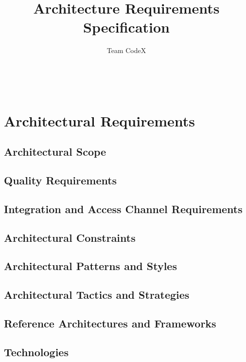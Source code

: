 \documentclass[11pt]{article}
\author{Team CodeX}
\title{Architecture Requirements Specification}
\begin{document}
	\setlength{\parskip}{6pt}
	
	
	
	\renewcommand{\thesection}{\arabic{section}}
	\newpage
	
	\tableofcontents
	
	\textsc{}\\[1cm]
	
	\newpage

	\section{Architectural Requirements}
	
	\subsection{Architectural Scope}
		
	
	\subsection{Quality Requirements}
		
	
	\subsection{Integration and Access Channel Requirements}
		
	
	\subsection{Architectural Constraints}
		
	
	\subsection{Architectural Patterns and Styles}
		
	
	\subsection{Architectural Tactics and Strategies}
		
	
	\subsection{Reference Architectures and Frameworks}
		
	
	\subsection{Technologies}
		
	
\end{document}
